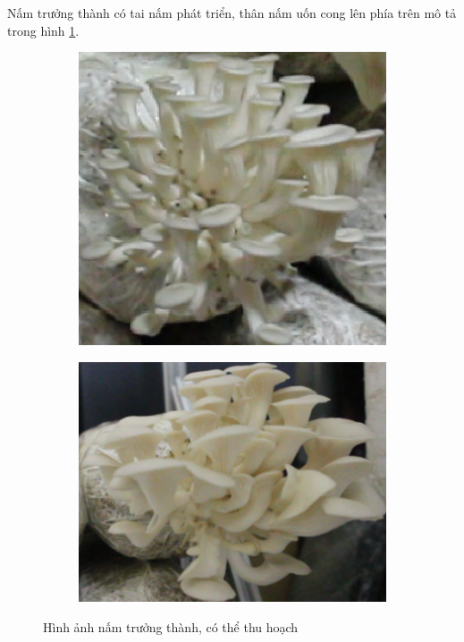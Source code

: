 Nấm trưởng thành có tai nấm phát triển, thân nấm uốn cong lên phía trên mô tả trong hình \ref{fig:ready}.

\begin{figure}[H]
    \centering
        \begin{subfigure}{.5\textwidth}
        \includegraphics[width=0.8\linewidth]{images/ready1.png}
    \end{subfigure}%
    \begin{subfigure}{.5\textwidth}
        \includegraphics[width=0.8\linewidth]{images/ready3.png}
    \end{subfigure}
    \caption{Hình ảnh nấm trưởng thành, có thể thu hoạch}
    \label{fig:ready}
\end{figure}

